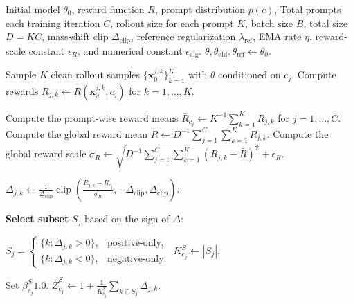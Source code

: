 \documentclass{article} %
\begin{document}
\begin{algorithm}
\caption{Reinforced Flow Matching with Subset Selection}
\label{alg:velocity-subset}
\begin{algorithmic}[1]
\Require Initial model $\theta_0$, reward function $R$, prompt distribution
$p(c)$, Total prompts each training iteration $C$, rollout size for each prompt $K$, batch size $B$, total size $D = KC$, 
mass-shift clip $\Delta_{\mathrm{clip}}$, reference regularization
$\lambda_{\mathrm{ref}}$, EMA rate $\eta$, reward-scale constant $\epsilon_R$, and numerical constant $\epsilon_{\mathrm{alg}}$.
\State $\theta,\theta_{\mathrm{old}},\theta_{\mathrm{ref}}
\leftarrow\theta_0$.

        \State Sample $K$ clean rollout samples
        $\{\mathbf{x}_{0}^{j,k}\}_{k=1}^{K}$
        with $\theta$ conditioned on $c_j$.
        \State Compute rewards
        $R_{j,k}\leftarrow R(\mathbf{x}_{0}^{j,k},c_j)$
        for $k=1,\ldots,K$.
    \EndFor

    \State Compute the prompt-wise reward means
    $\bar R_{c_j}\leftarrow K^{-1}\sum_{k=1}^{K}R_{j,k}$
    for $j=1,\ldots,C$.
    \State Compute the global reward mean
    $\bar R\leftarrow D^{-1}\sum_{j=1}^{C}\sum_{k=1}^{K}R_{j,k}$.
    \State Compute the global reward scale
    $\sigma_R\leftarrow
    \sqrt{D^{-1}\sum_{j=1}^{C}\sum_{k=1}^{K}(R_{j,k}-\bar R)^2}
    +\epsilon_R$.

            \State $\Delta_{j,k}
            \leftarrow
            \frac{1}{\Delta_{\mathrm{clip}}}
            \operatorname{clip}\left(
            \frac{R_{j,k}-\bar R_{c_j}}{\sigma_R},
            -\Delta_{\mathrm{clip}},\Delta_{\mathrm{clip}}\right)$.
        \EndFor
        
        \State \textbf{Select subset} $S_j$ based on the sign of $\Delta$:
        
        \State 
        $\displaystyle
        S_j =
        \begin{cases}
        \{k : \Delta_{j,k}>0\}, & \text{positive-only},\\
        \{k : \Delta_{j,k}<0\}, & \text{negative-only}.
        \end{cases}$
        \State $K_{c_j}^{S}\leftarrow |S_j|$. %
        
        \State Set $\beta_{c_j}^{S} 1.0$. %
        \State $\displaystyle
        \bar Z_{c_j}^{S}
        \leftarrow
        1 + \frac{1}{K_{c_j}^{S}}\sum_{k\in S_j} \Delta_{j,k}$. %


\end{algorithmic}
\end{algorithm}
\end{document}
